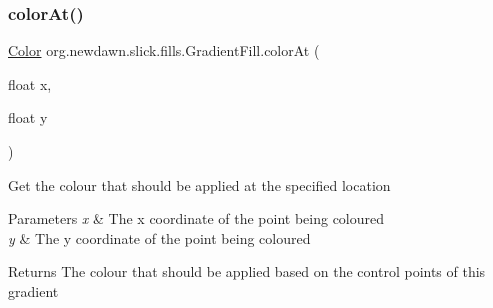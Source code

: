 \subsubsection{\texorpdfstring{color\+At()}{colorAt()}\hspace{0.1cm}{\footnotesize\ttfamily [2/2]}}
{\footnotesize\ttfamily \mbox{\hyperlink{classorg_1_1newdawn_1_1slick_1_1_color}{Color}} org.\+newdawn.\+slick.\+fills.\+Gradient\+Fill.\+color\+At (\begin{DoxyParamCaption}\item[{float}]{x,  }\item[{float}]{y }\end{DoxyParamCaption})\hspace{0.3cm}{\ttfamily [inline]}}

Get the colour that should be applied at the specified location


\begin{DoxyParams}{Parameters}
{\em x} & The x coordinate of the point being coloured \\
\hline
{\em y} & The y coordinate of the point being coloured \\
\hline
\end{DoxyParams}
\begin{DoxyReturn}{Returns}
The colour that should be applied based on the control points of this gradient 
\end{DoxyReturn}

